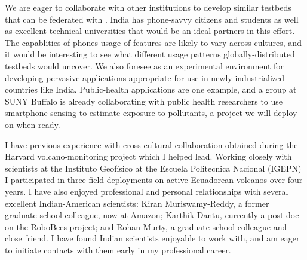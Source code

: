 
We are eager to collaborate with other institutions to develop similar
testbeds that can be federated with \PhoneLab{}. India has phone-savvy
citizens and students as well as excellent technical universities that would
be an ideal partners in this effort. The capablities of phones usage of
features are likely to vary across cultures, and it would be interesting to
see what different usage patterns globally-distributed testbeds would
uncover. We also foresee \PhoneLab{} as an experimental environment for
developing pervasive applications appropriate for use in newly-industrialized
countries like India. Public-health applications are one example, and a group
at SUNY Buffalo is already collaborating with public health researchers to
use smartphone sensing to estimate exposure to pollutants, a project we will
deploy on \PhoneLab{} when ready.


I have previous experience with cross-cultural collaboration obtained during
the Harvard volcano-monitoring project which I helped lead. Working closely
with scientists at the Instituto Geof\'{i}sico at the Escuela Politecnica
Nacional (IGEPN) I participated in three field deployments on active
Ecuadorean volcanos over four years. I have also enjoyed professional and
personal relationships with several excellent Indian-American scientists:
Kiran Muriswamy-Reddy, a former graduate-school colleague, now at Amazon;
Karthik Dantu, currently a post-doc on the RoboBees project; and Rohan Murty,
a graduate-school colleague and close friend. I have found Indian scientists
enjoyable to work with, and am eager to initiate contacts with them early in
my professional career.
